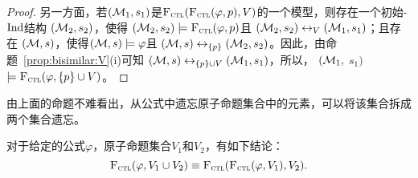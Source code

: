 \begin{proof}
	另一方面，若$({\cal M}_1, s_1)$是${\textsc{F}_{\textsc{ctl}}}({\textsc{F}_{\textsc{ctl}}}(\varphi, p), V)$的一个模型，则存在一个初始-$\textrm{Ind}$结构 $({\cal M}_2, s_2)$，使得 $({\cal M}_2, s_2) \models {\textsc{F}_{\textsc{ctl}}}(\varphi, p)$且 $({\cal M}_2, s_2) \leftrightarrow_V ({\cal M}_1, s_1)$；且存在 $({\cal M}, s)$，使得$({\cal M}, s) \models \varphi$且 $({\cal M}, s) \leftrightarrow_{\{p\}} ({\cal M}_2, s_2)$。因此，由命题~\ref{prop:bisimilar:V}(i)可知 $({\cal M}, s) \leftrightarrow_{\{p\} \cup V} ({\cal M}_1, s_1)$，所以， $({\cal M}_1,$ $s_1)$ $\models {\textsc{F}_{\textsc{ctl}}}(\varphi, \{p\} \cup V)$。
\end{proof}

由上面的命题不难看出，从公式中遗忘原子命题集合中的元素，可以将该集合拆成两个集合遗忘。
\begin{corollary}
	对于给定的公式$\varphi$，原子命题集合$V_1$和$V_2$，有如下结论：
	\[
	{\textsc{F}_{\textsc{ctl}}}(\varphi,V_1\cup V_2) \equiv {\textsc{F}_{\textsc{ctl}}}({\textsc{F}_{\textsc{ctl}}}(\varphi,V_1),V_2).
	\]
\end{corollary}

